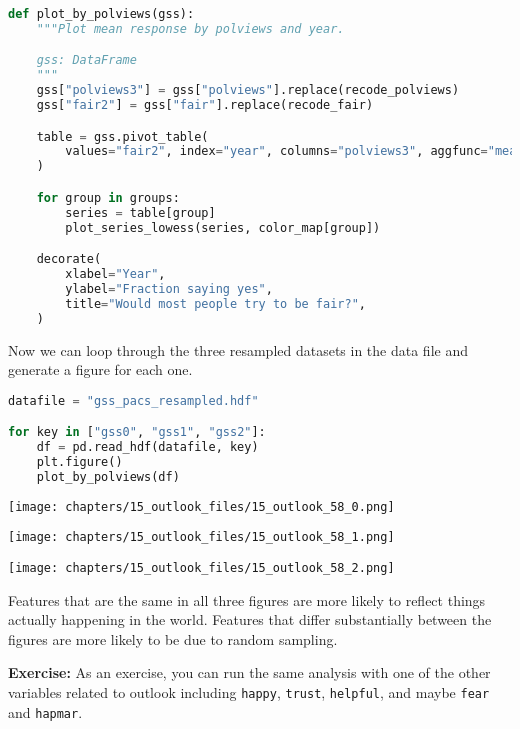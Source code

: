 \begin{lstlisting}[language=Python,style=source]
def plot_by_polviews(gss):
    """Plot mean response by polviews and year.

    gss: DataFrame
    """
    gss["polviews3"] = gss["polviews"].replace(recode_polviews)
    gss["fair2"] = gss["fair"].replace(recode_fair)

    table = gss.pivot_table(
        values="fair2", index="year", columns="polviews3", aggfunc="mean"
    )

    for group in groups:
        series = table[group]
        plot_series_lowess(series, color_map[group])

    decorate(
        xlabel="Year",
        ylabel="Fraction saying yes",
        title="Would most people try to be fair?",
    )
\end{lstlisting}

Now we can loop through the three resampled datasets in the data file
and generate a figure for each one.

\begin{lstlisting}[language=Python,style=source]
datafile = "gss_pacs_resampled.hdf"

for key in ["gss0", "gss1", "gss2"]:
    df = pd.read_hdf(datafile, key)
    plt.figure()
    plot_by_polviews(df)
\end{lstlisting}

\begin{center}
\texttt{[image: chapters/15\_outlook\_files/15\_outlook\_58\_0.png]}
\end{center}

\begin{center}
\texttt{[image: chapters/15\_outlook\_files/15\_outlook\_58\_1.png]}
\end{center}

\begin{center}
\texttt{[image: chapters/15\_outlook\_files/15\_outlook\_58\_2.png]}
\end{center}

Features that are the same in all three figures are more likely to
reflect things actually happening in the world. Features that differ
substantially between the figures are more likely to be due to random
sampling.

\textbf{Exercise:} As an exercise, you can run the same analysis with
one of the other variables related to outlook including
\passthrough{\lstinline!happy!}, \passthrough{\lstinline!trust!},
\passthrough{\lstinline!helpful!}, and maybe
\passthrough{\lstinline!fear!} and \passthrough{\lstinline!hapmar!}.

